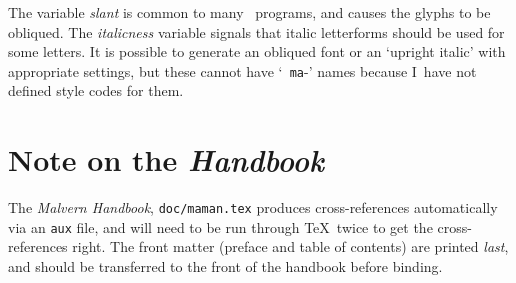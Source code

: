 	The variable {\it slant} is common to many \MF\ programs, and
	causes the glyphs to be obliqued.  The {\it italicness} variable
	signals that italic letterforms should be used for some letters.
	It is possible to generate an obliqued font or an `upright
	italic' with appropriate settings, but these cannot have `{\tt
	ma}-' names because I~have not defined style codes for them.

\section{Note on the {\it Handbook}}
	The {\it Malvern Handbook}, {\tt doc/maman.tex} produces
	cross-references automatically via an {\tt aux} file, and will
	need to be run through \TeX\ twice to get the cross-references
	right.  The front matter (preface and table of contents) are
	printed {\it last}, and should be transferred to the front of
	the handbook before binding.

\bye

